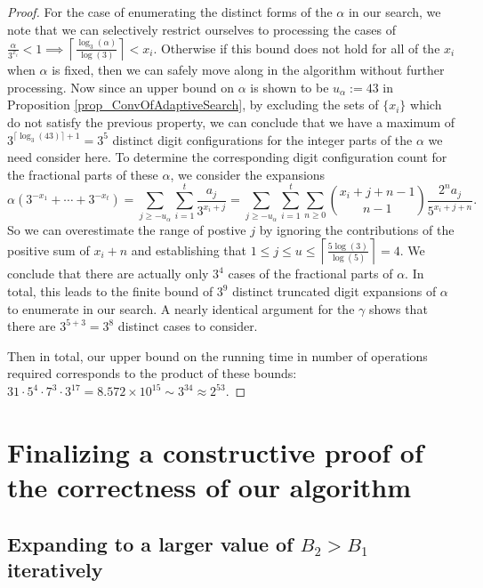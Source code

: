 \documentclass[12pt]{article}
\begin{document}
\begin{proof}
For the case of enumerating the distinct forms of the $\alpha$ in our search, we note that we can 
selectively restrict ourselves to processing the cases of 
$\frac{\alpha}{3^{x_i}} < 1 \implies \left\lceil \frac{\log_3(\alpha)}{\log(3)} \right\rceil < x_i$. 
Otherwise if this bound does not hold for all of the $x_i$ when $\alpha$ is fixed, then we can 
safely move along in the algorithm without further processing. Now since an upper bound on $\alpha$ is 
shown to be $u_{\alpha} := 43$ in Proposition \ref{prop_ConvOfAdaptiveSearch}, by excluding the 
sets of $\{x_i\}$ which do not satisfy the previous property, we can conclude that we have a maximum 
of $3^{\lceil \log_3(43) \rceil + 1} = 3^5$ distinct digit configurations for the integer parts of the 
$\alpha$ we need consider here. To determine the corresponding digit configuration count for the 
fractional parts of these $\alpha$, we consider the expansions 
\[
\alpha\left(3^{-x_1}+\cdots+3^{-x_t}\right) = \sum_{j \geq -u_{\alpha}} \sum_{i=1}^t \frac{a_j}{3^{x_i+j}} = 
     \sum_{j \geq -u_{\alpha}} \sum_{i=1}^t \sum_{n \geq 0} \binom{x_i+j+n-1}{n-1} \frac{2^n a_j}{ 
     5^{x_i+j+n}}. 
\]
So we can overestimate the range of postive $j$ by ignoring the contributions of the positive sum of 
$x_i+n$ and establishing that $1 \leq j \leq u \leq \left\lceil \frac{5\log(3)}{\log(5)} \right\rceil = 4$. 
We conclude that there are actually only $3^4$ cases of the fractional parts of $\alpha$. 
In total, this leads to the finite bound of $3^9$ distinct truncated digit expansions of $\alpha$ to 
enumerate in our search. A nearly identical argument for the $\gamma$ shows that there are 
$3^{5+3} = 3^8$ distinct cases to consider. 

Then in total, our upper bound on the running time in number of operations required corresponds to the 
product of these bounds: 
$31 \cdot 5^4 \cdot 7^3 \cdot 3^{17}= 8.572 \times 10^{15} \sim 3^{34} \approx 2^{53}$. 
\end{proof} 

\section{Finalizing a constructive proof of the correctness of our algorithm} 

\subsection{Expanding to a larger value of $B_2 > B_1$ iteratively}
\end{document}
